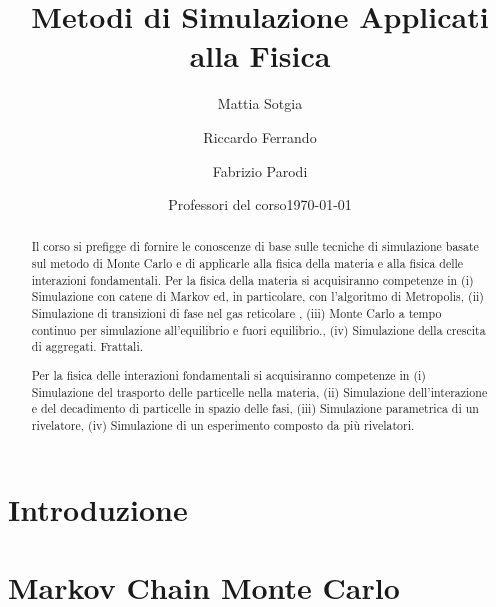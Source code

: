 \documentclass[
    rmp, amsmath,amssymb, titlepage,
    reprint, nofootinbib, eprint
]{revtex4-2}
\begin{document}
\title{Metodi di Simulazione Applicati alla Fisica}
\author{Mattia Sotgia}


\author{Riccardo Ferrando}

\author{Fabrizio Parodi}

\date{Professori del corso}
\date{\today}

\begin{abstract}
    Il corso si prefigge di fornire le conoscenze di base sulle tecniche di simulazione basate sul metodo di Monte Carlo e di applicarle alla fisica della materia e alla fisica delle interazioni fondamentali. Per la fisica della materia si acquisiranno competenze in (i) Simulazione con catene di Markov ed, in particolare, con l'algoritmo di Metropolis, (ii) Simulazione di transizioni di fase nel gas reticolare , (iii) Monte Carlo a tempo continuo per simulazione all'equilibrio e fuori equilibrio., (iv) Simulazione della crescita di aggregati. Frattali.
    
    Per la fisica delle interazioni fondamentali si acquisiranno competenze in (i) Simulazione del trasporto delle particelle nella materia, (ii) Simulazione dell'interazione e del decadimento di particelle in spazio delle fasi, (iii) Simulazione parametrica di un rivelatore, (iv) Simulazione di un esperimento composto da più rivelatori. 
\end{abstract}
\maketitle

\tableofcontents

\section{Introduzione}



\section{Markov Chain Monte Carlo}



% 
\end{document}
